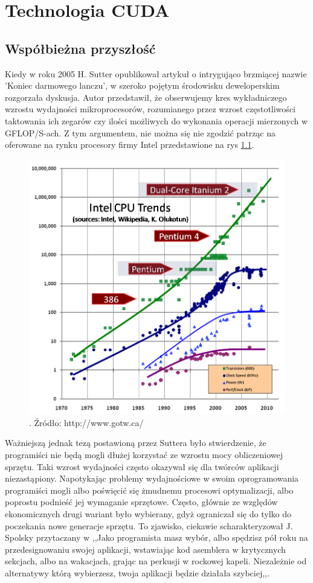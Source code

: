 \chapter{Technologia CUDA}
\section{Współbieżna przyszłość}
Kiedy w roku 2005 H. Sutter \cite{lunch} opublikował artykuł o intrygująco brzmiącej nazwie 'Koniec darmowego lanczu', w szeroko pojętym środowisku deweloperskim rozgorzała dyskusja. Autor przedstawił, że obserwujemy kres wykładniczego wzrostu wydajności mikroprocesorów, rozumianego przez wzrost częstotliwości taktowania ich zegarów czy ilości możliwych do wykonania operacji mierzonych w GFLOP/S-ach. Z tym argumentem, nie można się nie zgodzić patrząc na oferowane na rynku procesory firmy Intel przedstawione na rys \ref{proce}.

\begin{figure}[ht]
\centering
\includegraphics[scale=1.0]{images/CPU.png}
\caption{.  Źródło: http://www.gotw.ca/}
\label{proce}
\end{figure}

Ważniejszą jednak tezą postawioną przez Suttera było stwierdzenie, że programiści nie będą mogli dłużej korzystać ze wzrostu mocy obliczeniowej sprzętu. Taki wzrost wydajności często okazywał się dla twórców aplikacji niezastąpiony. Napotykając problemy wydajnościowe w swoim oprogramowania programiści mogli albo poświęcić się żmudnemu procesowi optymalizacji, albo poprostu podnieść jej wymaganie sprzętowe. Często, głównie ze względów ekonomicznych drugi wariant było wybierany, gdyż ograniczał się do tylko do poczekania nowe generacje sprzętu. To zjawisko, ciekawie scharakteryzował J. Spolsky przytaczany w \cite{nolunch} ,,Jako programista masz wybór, albo spędzisz pół roku na przedesignowaniu swojej aplikacji, wstawiając kod asemblera w krytycznych sekcjach, albo na wakacjach, grając na perkusji w rockowej kapeli. Niezależnie od alternatywy którą wybierzesz, twoja aplikacji będzie działała szybciej,,.

